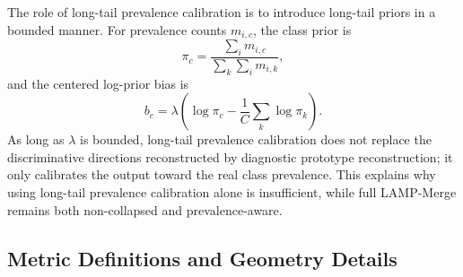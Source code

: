 \documentclass[letterpaper]{article} %
\begin{document}
The role of long-tail prevalence calibration is to introduce long-tail priors in a bounded manner. For prevalence counts $m_{i,c}$, the class prior is
\begin{equation}
\pi_c=\frac{\sum_i m_{i,c}}{\sum_k \sum_i m_{i,k}},
\end{equation}
and the centered log-prior bias is
\begin{equation}
b_c=\lambda\left(\log\pi_c-\frac{1}{C}\sum_k\log\pi_k\right).
\end{equation}
As long as $\lambda$ is bounded, long-tail prevalence calibration does not replace the discriminative directions reconstructed by diagnostic prototype reconstruction; it only calibrates the output toward the real class prevalence. This explains why using long-tail prevalence calibration alone is insufficient, while full LAMP-Merge remains both non-collapsed and prevalence-aware.

\subsection{Metric Definitions and Geometry Details}
\label{app:metric-geometry}
\end{document}
